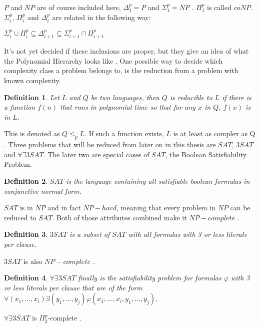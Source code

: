 \documentclass[12pt,a4paper]{article}
\newtheorem{definition}{Definition}
\begin{document}
$P$ and $NP$ are of course included here, $\Delta^p_1 = P$ and $\Sigma^p_1 = NP$ \citep{Meyer1972}. $\Pi^p_1 $ is called $coNP$.
\newline
$\Sigma^p_i$, $\Pi^p_i$ and $\Delta^p_i$ are related in the following way:
\begin{center}
	$\Sigma^p_i \cup \Pi^p_i \subseteq \Delta^p_{i+1} \subseteq \Sigma^p_{i+1} \cap \Pi^p_{i+1}$
\end{center}
It's not yet decided if these inclusions are proper, but they give an idea of what the Polynomial Hierarchy looks like \citep{Stockmeyer1976}.
\newline
One possible way to decide which complexity class a problem belongs to, is the reduction from a problem with known complexity. 
\begin{definition} Let $L$ and $Q$ be two languages, then $Q$ is reducible to $L$ if there is a function $f(n)$ that runs in polynomial time so that for any $x$ in $Q$, $f(x)$ is in $L$. 
\end{definition} 
This is denoted as $Q \leq_p L$. If such a function exists, $L$ is at least as complex as Q \citep{Davis1983}. 
\newline
Three problems that will be reduced from later on in this thesis are $SAT$, $3SAT$ and $\forall \exists 3SAT$. The later two are special cases of $SAT$, the Boolean Satisfiability Problem. 
\begin{definition} 
$SAT$ is the language containing all satisfiable boolean formulas in conjunctive normal form. 
\end{definition} 
$SAT$ is in $NP$ and in fact $NP-hard$, meaning that every problem in $NP$ can be reduced to $SAT$. Both of those attributes combined make it $NP-complete$ \citep[p. 338-346]{Davis1983}.
\begin{definition} $3SAT$ is a subset of $SAT$ with all formulas with 3 or less literals per clause.
\end{definition} 
$3SAT$ is also $NP-complete$ \citep[p. 347]{Davis1983}.
\begin{definition}
$\forall \exists 3SAT$ finally is the satisfiability problem for formulas $\varphi$ with 3 or less literals per clause that are of the form \\ $\forall (x_1, ..., x_i) \exists (y_1, ..., y_j) \varphi(x_1, ..., x_i, y_1, ..., y_j)$.
\end{definition} 
$\forall \exists 3SAT$ is $\Pi^p_2$-complete \citep{Schaefer2002}.

\newpage
\end{document}
